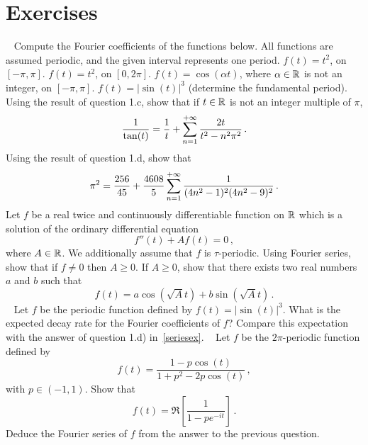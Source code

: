 \section{Exercises}
\begin{ExerciseList}
  \Exercise[label=seriesex]~
  \Question Compute the Fourier coefficients of the functions below. All functions are assumed periodic, and the given interval represents one period.
  \subQuestion $f(t)=t^2$, on $[-\pi,\pi]$.
  \subQuestion $f(t)=t^2$, on $[0,2\pi]$.
  \subQuestion $f(t)=\cos(\alpha t)$, where $\alpha\in\mathbb{R}$ is not an integer, on $[-\pi,\pi]$.
  \subQuestion $f(t)=|\sin(t)|^3$ (determine the fundamental period).
  \Question Using the result of question 1.c, show that if $t\in\mathbb{R}$ is not an integer multiple of $\pi$,
  \begin{equation}
    \frac{1}{\tan(t)}=\frac{1}{t}+\sum_{n=1}^{+\infty}\frac{2t}{t^2-n^2\pi^2}\,.\label{eq:cotan-sing}
  \end{equation}
  \Question Using the result of question 1.d, show that
  \begin{equation}
    \pi^2=\frac{256}{45}+\frac{4608}{5}\sum_{n=1}^{+\infty}\frac{1}{(4n^2-1)^2(4n^2-9)^2}\,.\label{eq:hard-pi2}
  \end{equation}
  \Exercise[label=fourierode2] Let $f$ be a real twice and continuously differentiable function on $\mathbb{R}$ which is
  a solution of the ordinary differential equation
  \begin{equation}
    f''(t) + A f(t) = 0\,,\label{eq:fourierode2}
  \end{equation}
  where $A\in\mathbb{R}$. We additionally assume that $f$ is $\tau$-periodic.
  \Question Using Fourier series, show that if $f\neq 0$ then $A\geq 0$.
  \Question If $A\geq 0$, show that there exists two real numbers $a$ and $b$
  such that
  \begin{equation}
    f(t)=a\cos(\sqrt{A} t)+b\sin(\sqrt{A} t)\,.
  \end{equation}
  \Exercise[label=seriesdecay]~
  Let $f$ be the periodic function defined by $f(t)=|\sin(t)|^3$. What is the expected
  decay rate for the Fourier coefficients of $f$? Compare this expectation with the
answer of question 1.d) in~\cref{seriesex}.
\Exercise[label=seriessmooth]~
Let $f$ be the $2\pi$-periodic function defined by
\begin{equation}
  f(t)=\frac{1-p\cos(t)}{1+p^2-2p\cos(t)}\,,
\end{equation}
with $p\in(-1,1)$.
\Question Show that
\begin{equation}
  f(t)=\Re\left[\frac{1}{1-pe^{-it}}\right]\,.
\end{equation}
\Question Deduce the Fourier series of $f$ from the answer to the previous question.
\pagebreak
{}
\end{ExerciseList}
